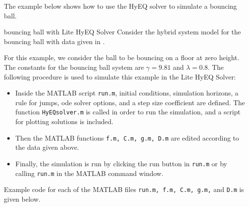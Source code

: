 The example below shows how to use the HyEQ solver to simulate a bouncing ball.

\begin{example}{bouncing ball with Lite HyEQ Solver}
\label{ex:bblite} Consider the hybrid system model for the bouncing ball with data given in .

For this example, we consider the ball to be bouncing on a floor at zero height. The constants for the bouncing ball system are $\gamma = 9.81$ and $\lambda=0.8$.
The following procedure is used to simulate this example in the Lite HyEQ Solver:
\begin{itemize}
\item Inside the MATLAB script {\tt run.m}, initial conditions, simulation horizons, a rule for jumps, ode solver options, and a step size coefficient are defined. The function {\tt HyEQsolver.m} is called in order to run the simulation, and a script for plotting solutions is included.
\item Then the MATLAB functions {\tt f.m, C.m, g.m, D.m} are edited according to the data given above.
\item Finally, the simulation is run by clicking the run button in {\tt run.m} or by calling {\tt run.m} in the MATLAB command window.
\end{itemize}

Example code for each of the MATLAB files {\tt run.m, f.m, C.m, g.m,} and {\tt D.m} is given below.\\

\label{scr:run}

\label{scr:f}

\label{scr:C}

\label{scr:g}

\label{scr:D}


\end{example}
